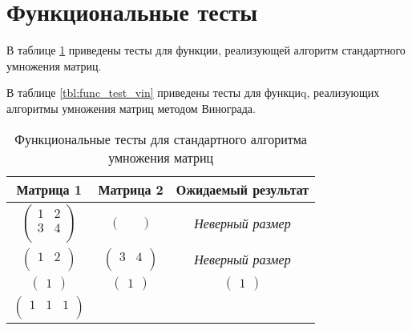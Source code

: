 \section{Функциональные тесты}
В таблице \ref{tbl:func_test_std} приведены тесты для функции, реализующей алгоритм стандартного умножения матриц.

В таблице \ref{tbl:func_test_vin} приведены тесты для функциq, реализующих алгоритмы умножения матриц методом Винограда.

\begin{table}[h!]
    \caption{Функциональные тесты для стандартного алгоритма умножения матриц}
    \label{tbl:func_test_std}
    \centering
        \begin{tabular}{||c|c|c||} 
        \hline
        Матрица 1& Матрица 2& Ожидаемый результат \\
        \hline\hline
        $\begin{pmatrix}
            1 & 2\\
            3 & 4\\
        \end{pmatrix}$ 
        &  
        $\begin{pmatrix}
            &
        \end{pmatrix}$
        &
        \textit{Неверный размер} \\
        \hline
        $\begin{pmatrix}
            1 & 2\\
        \end{pmatrix}$ 
        &  
        $\begin{pmatrix}
            3 & 4\\
        \end{pmatrix}$
        &
        \textit{Неверный размер} \\
        \hline
        $\begin{pmatrix}
            1
        \end{pmatrix}$ 
        &  
        $\begin{pmatrix}
            1
        \end{pmatrix}$
        &
        $\begin{pmatrix}
            1
        \end{pmatrix}$ \\
        \hline
        $\begin{pmatrix}
            1 & 1 & 1\\
        \end{pmatrix}$ 
        &  

\end{tabular}
\end{table}
